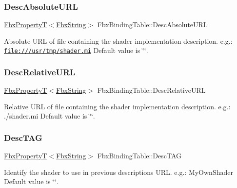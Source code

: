 \subsubsection{\texorpdfstring{Desc\+Absolute\+U\+RL}{DescAbsoluteURL}}
{\footnotesize\ttfamily \hyperlink{class_fbx_property_t}{Fbx\+PropertyT}$<$\hyperlink{class_fbx_string}{Fbx\+String}$>$ Fbx\+Binding\+Table\+::\+Desc\+Absolute\+U\+RL}

Absolute U\+RL of file containing the shader implementation description. e.\+g.\+: \href{file:///usr/tmp/shader.mi}{\tt file\+:///usr/tmp/shader.\+mi} Default value is \char`\"{}\char`\"{}. \mbox{\label{class_fbx_binding_table_acb06f75ac993d6f92788beb82298775b}} 
\subsubsection{\texorpdfstring{Desc\+Relative\+U\+RL}{DescRelativeURL}}
{\footnotesize\ttfamily \hyperlink{class_fbx_property_t}{Fbx\+PropertyT}$<$\hyperlink{class_fbx_string}{Fbx\+String}$>$ Fbx\+Binding\+Table\+::\+Desc\+Relative\+U\+RL}

Relative U\+RL of file containing the shader implementation description. e.\+g.\+: ./shader.mi Default value is \char`\"{}\char`\"{}. \mbox{\label{class_fbx_binding_table_aa1ac440c2724fdc420ec3f02fa88aede}} 
\subsubsection{\texorpdfstring{Desc\+T\+AG}{DescTAG}}
{\footnotesize\ttfamily \hyperlink{class_fbx_property_t}{Fbx\+PropertyT}$<$\hyperlink{class_fbx_string}{Fbx\+String}$>$ Fbx\+Binding\+Table\+::\+Desc\+T\+AG}

Identify the shader to use in previous description\textquotesingle{}s U\+RL. e.\+g.\+: My\+Own\+Shader Default value is \char`\"{}\char`\"{}. \mbox{\label{class_fbx_binding_table_aa325052377541732db179bf60c9c9d3d}} 
